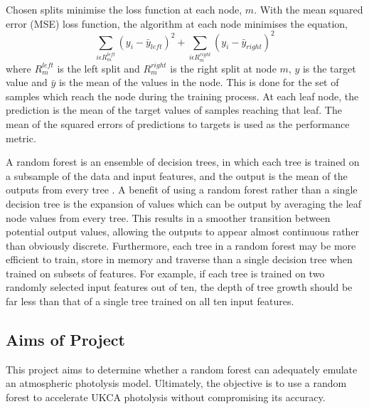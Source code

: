 \documentclass[journal abbreviation, manuscript]{copernicus}
\begin{document}
Chosen splits minimise the loss function at each node, $m$. 
With the mean squared error (MSE) loss function, the algorithm at each node minimises the equation,
\begin{equation}
 \sum_{i\epsilon R^{left}_{m}}(y_i - \bar{y}_{left})^2 + 
   \sum_{i\epsilon R^{right}_{m}}(y_i - \bar{y}_{right})^2
\end{equation}
where $R^{left}_{m}$ is the left split and $R^{right}_{m}$ is the right split at node $m$, $y$ is the target value and $\bar{y}$ is the mean of the values in the node. This is done for the set of samples which reach the node during the training process.
At each leaf node, the prediction is the mean of the target values of samples reaching that leaf. 
The mean of the squared errors of predictions to targets is used as the performance metric.

A random forest is an ensemble of decision trees, in which each tree is trained on a subsample of the data and input features, and the output is the mean of the outputs from every tree \citep{james_introduction_2023}.
A benefit of using a random forest rather than a single decision tree is the expansion of values which can be output by averaging the leaf node values from every tree. This results in a smoother transition between potential output values, allowing the outputs to appear almost continuous rather than obviously discrete. Furthermore, each tree in a random forest may be more efficient to train, store in memory and traverse than a single decision tree when trained on subsets of features. For example, if each tree is trained on two randomly selected input features out of ten, the depth of tree growth should be far less than that of a single tree trained on all ten input features.   

\subsection{Aims of Project}

This project aims to determine whether a random forest can adequately emulate an atmospheric photolysis model. Ultimately, the objective is to use a random forest to accelerate UKCA photolysis without compromising its accuracy. 
\end{document}
